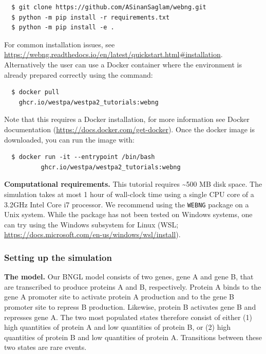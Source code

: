 \begin{verbatim}
  $ git clone https://github.com/ASinanSaglam/webng.git
  $ python -m pip install -r requirements.txt
  $ python -m pip install -e .
\end{verbatim}

For common installation issues, see {\url{https://webng.readthedocs.io/en/latest/quickstart.html#installation}}. Alternatively the user can use a Docker container where the environment is already prepared correctly using the command: 
\begin{verbatim}
  $ docker pull 
    ghcr.io/westpa/westpa2_tutorials:webng
\end{verbatim}

Note that this requires a Docker installation, for more information see Docker documentation ({\url{https://docs.docker.com/get-docker}}). 
Once the docker image is downloaded, you can run the image with:
\begin{verbatim}
  $ docker run -it --entrypoint /bin/bash 
          ghcr.io/westpa/westpa2_tutorials:webng
\end{verbatim}

\textbf{Computational requirements.} This tutorial requires \textasciitilde500 MB disk space. 
The simulation takes at most 1 hour of wall-clock time using a single CPU core of a 3.2GHz Intel Core i7 processor. 
We recommend using the \verb|WEBNG| package on a Unix system. 
While the package has not been tested on Windows systems, one can try using the Windows subsystem for Linux (WSL; {\url{https://docs.microsoft.com/en-us/windows/wsl/install}}).

\subsubsection{Setting up the simulation}

\noindent\textbf{The model.} Our BNGL model consists of two genes, gene A and gene B, that are transcribed to produce proteins A and B, respectively. 
Protein A binds to the gene A promoter site to activate protein A production and to the gene B promoter site to repress B production. 
Likewise, protein B activates gene B and represses gene A. 
The two most populated states therefore consist of either (1) high quantities of protein A and low quantities of protein B, or (2) high quantities of protein B and low quantities of protein A. 
Transitions between these two states are rare events. 


